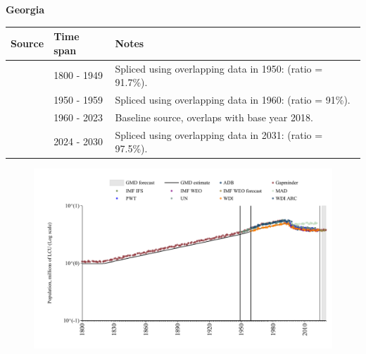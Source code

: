 \documentclass[12pt,a4paper,landscape]{article}
\begin{document}
\begin{adjustbox}{max totalsize={\paperwidth}{\paperheight},center}
\begin{minipage}[t][\textheight][t]{\textwidth}
\vspace*{0.5cm}
{}
\begin{center}
{\Large\bfseries Georgia}
\end{center}
\vspace{0.5cm}
\begin{table}[H]
\centering
\small
\begin{tabular}{|l|l|l|}
\hline
\textbf{Source} & \textbf{Time span} & \textbf{Notes} \\
\hline
\rowcolor{white}\cite{Gapminder}& 1800 - 1949 &Spliced using overlapping data in 1950: (ratio = 91.7\%).\\
\rowcolor{lightgray}\cite{IMF_IFS}& 1950 - 1959 &Spliced using overlapping data in 1960: (ratio = 91\%).\\
\rowcolor{white}\cite{WDI}& 1960 - 2023 &Baseline source, overlaps with base year 2018.\\
\rowcolor{lightgray}\cite{Gapminder}& 2024 - 2030 &Spliced using overlapping data in 2031: (ratio = 97.5\%).\\
\hline
\end{tabular}
\end{table}
\begin{figure}[H]
\centering
\includegraphics[width=\textwidth,height=0.6\textheight,keepaspectratio]{graphs/GEO_pop.pdf}
\end{figure}
\end{minipage}
\end{adjustbox}
\end{document}

